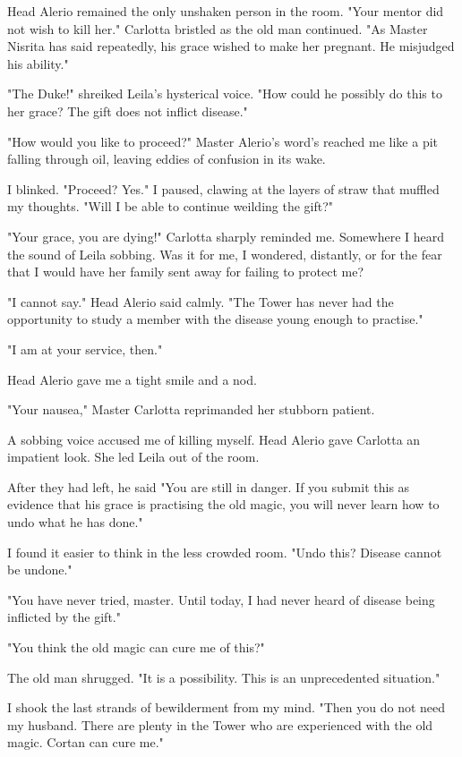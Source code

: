 \documentclass{article}
\begin{document}
Head Alerio remained the only unshaken person in the room. "Your mentor did not wish to kill her." Carlotta bristled as the old man continued. "As Master Nisrita has said repeatedly, his grace wished to make her pregnant. He misjudged his ability."

"The Duke!" shreiked Leila's hysterical voice. "How could he possibly do this to her grace? The gift does not inflict disease."

"How would you like to proceed?" Master Alerio's word's reached me like a pit falling through oil, leaving eddies of confusion in its wake.

I blinked. "Proceed? Yes." I paused, clawing at the layers of straw that muffled my thoughts. "Will I be able to continue weilding the gift?"

"Your grace, you are dying!" Carlotta sharply reminded me. Somewhere I heard the sound of Leila sobbing. Was it for me, I wondered, distantly, or for the fear that I would have her family sent away for failing to protect me?

"I cannot say." Head Alerio said calmly. "The Tower has never had the opportunity to study a member with the disease young enough to practise."

"I am at your service, then."

Head Alerio gave me a tight smile and a nod. 

"Your nausea," Master Carlotta reprimanded her stubborn patient.

A sobbing voice accused me of killing myself. Head Alerio gave Carlotta an impatient look. She led Leila out of the room.

After they had left, he said "You are still in danger. If you submit this as evidence that his grace is practising the old magic, you will never learn how to undo what he has done."

I found it easier to think in the less crowded room. "Undo this? Disease cannot be undone."

"You have never tried, master. Until today, I had never heard of disease being inflicted by the gift."

"You think the old magic can cure me of this?"

The old man shrugged. "It is a possibility. This is an unprecedented situation."

I shook the last strands of bewilderment from my mind. "Then you do not need my husband. There are plenty in the Tower who are experienced with the old magic. Cortan can cure me."
\end{document}
